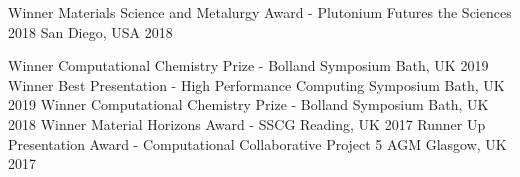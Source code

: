 \begin{cvhonors}
  \cvhonor
    {Winner}
    {Materials Science and Metalurgy Award - Plutonium Futures the Sciences 2018}
    {San Diego, USA}
    {2018}
\end{cvhonors}

\begin{cvhonors}
  \cvhonor
    {Winner}
    {Computational Chemistry Prize - Bolland Symposium}
    {Bath, UK}
    {2019}
  \cvhonor
    {Winner}
    {Best Presentation - High Performance Computing Symposium}
    {Bath, UK}
    {2019}
  \cvhonor
    {Winner}
    {Computational Chemistry Prize - Bolland Symposium}
    {Bath, UK}
    {2018}
   \cvhonor
    {Winner}
    {Material Horizons Award - SSCG}
    {Reading, UK}
    {2017}
   \cvhonor
    {Runner Up}
    {Presentation Award - Computational Collaborative Project 5 AGM}
    {Glasgow, UK}
    {2017}
\end{cvhonors}
